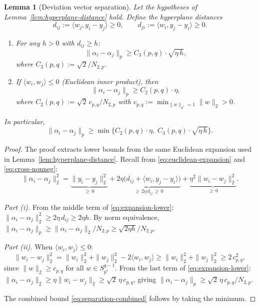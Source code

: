\documentclass[11pt]{article}
\newtheorem{lemma}[theorem]{Lemma}
\newcommand{\pstar}{p^*}
\begin{document}
\begin{lemma}[Deviation vector separation]\label{lem:separation}
Let the hypotheses of Lemma~\ref{lem:hyperplane-distance} hold. Define the hyperplane distances
\[
d_{ij} := \langle w_j, y_i - y_j \rangle \ge 0, \qquad d_{ji} := \langle w_i, y_j - y_i \rangle \ge 0.
\]
\begin{enumerate}
\item[(i)] For any $h > 0$ with $d_{ij} \ge h$:
\begin{equation}\label{eq:separation}
\|\alpha_i - \alpha_j\|_p \ge C_3(p,q) \cdot \sqrt{\eta \, h},
\end{equation}
where $C_3(p,q) := \sqrt{2}/N_{2,p}$.
\item[(ii)] If $\langle w_i, w_j \rangle \le 0$ (Euclidean inner product), then
\begin{equation}\label{eq:separation-normals}
\|\alpha_i - \alpha_j\|_p \ge C_2(p,q) \cdot \eta,
\end{equation}
where $C_2(p,q) := \sqrt{2}\, c_{p,q} / N_{2,p}$ with $c_{p,q} := \min_{\|w\|_{\pstar}=1} \|w\|_2 > 0$.
\end{enumerate}
In particular,
\begin{equation}\label{eq:separation-combined}
\|\alpha_i - \alpha_j\|_p \ge \min\bigl\{ C_2(p,q) \cdot \eta,\; C_3(p,q) \cdot \sqrt{\eta \, h} \bigr\}.
\end{equation}
\end{lemma}

\begin{proof}
The proof extracts lower bounds from the same Euclidean expansion used in Lemma~\ref{lem:hyperplane-distance}. Recall from \eqref{eq:euclidean-expansion} and \eqref{eq:cross-nonneg}:
\begin{equation}\label{eq:expansion-lower}
\|\alpha_i - \alpha_j\|_2^2
= \underbrace{\|y_i - y_j\|_2^2}_{\ge\, 0}
+ \underbrace{2\eta\bigl(d_{ij} + \langle w_i, y_j - y_i\rangle\bigr)}_{\ge\, 2\eta \, d_{ij}\, \ge\, 0}
+ \underbrace{\eta^2 \|w_i - w_j\|_2^2}_{\ge\, 0}.
\end{equation}

\medskip
\noindent\emph{Part (i).}
From the middle term of \eqref{eq:expansion-lower}: $\|\alpha_i - \alpha_j\|_2^2 \ge 2\eta \, d_{ij} \ge 2\eta h$. By norm equivalence, $\|\alpha_i - \alpha_j\|_p \ge \|\alpha_i - \alpha_j\|_2 / N_{2,p} \ge \sqrt{2\eta h}/N_{2,p}$.

\medskip
\noindent\emph{Part (ii).}
When $\langle w_i, w_j \rangle \le 0$:
\[
\|w_i - w_j\|_2^2 = \|w_i\|_2^2 + \|w_j\|_2^2 - 2\langle w_i, w_j\rangle \ge \|w_i\|_2^2 + \|w_j\|_2^2 \ge 2\,c_{p,q}^2,
\]
since $\|w\|_2 \ge c_{p,q}$ for all $w \in S_{\pstar}^{q-1}$. From the last term of \eqref{eq:expansion-lower}: $\|\alpha_i - \alpha_j\|_2 \ge \eta\|w_i - w_j\|_2 \ge \sqrt{2}\,\eta\, c_{p,q}$, giving $\|\alpha_i - \alpha_j\|_p \ge \sqrt{2}\,\eta\, c_{p,q}/N_{2,p}$.

\medskip
The combined bound \eqref{eq:separation-combined} follows by taking the minimum.
\end{proof}
\end{document}
